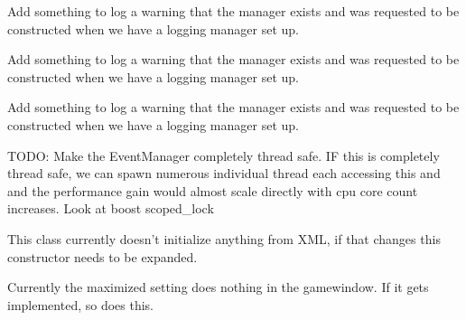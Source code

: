 \begin{DoxyRefList}
\item[\label{todo__todo000074}%
\hypertarget{todo__todo000074}{}%
Member \hyperlink{classMezzanine_1_1DefaultTimerManagerFactory_ad8cac8b702a8f9637ad1cd5e2ecddc3f}{Mezzanine\-:\-:Default\-Timer\-Manager\-Factory\-:\-:Create\-Manager} (X\-M\-L\-::\-Node \&X\-M\-L\-Node)]Add something to log a warning that the manager exists and was requested to be constructed when we have a logging manager set up.  
\item[\label{todo__todo000077}%
\hypertarget{todo__todo000077}{}%
Member \hyperlink{classMezzanine_1_1DefaultUIManagerFactory_aee5a9ea55ba77f7d118dc052605bf2d3}{Mezzanine\-:\-:Default\-U\-I\-Manager\-Factory\-:\-:Create\-Manager} (Name\-Value\-Pair\-List \&Params)]Add something to log a warning that the manager exists and was requested to be constructed when we have a logging manager set up.  
\item[\label{todo__todo000078}%
\hypertarget{todo__todo000078}{}%
Member \hyperlink{classMezzanine_1_1DefaultUIManagerFactory_a64230cbd8c6dffa83018189d0dae5116}{Mezzanine\-:\-:Default\-U\-I\-Manager\-Factory\-:\-:Create\-Manager} (X\-M\-L\-::\-Node \&X\-M\-L\-Node)]Add something to log a warning that the manager exists and was requested to be constructed when we have a logging manager set up.  
\item[\label{todo__todo000027}%
\hypertarget{todo__todo000027}{}%
Member \hyperlink{classMezzanine_1_1EventManager_a95ce9d2d865b0d8d9468448969b0ade2}{Mezzanine\-:\-:Event\-Manager\-:\-:Event\-Manager} ()]T\-O\-D\-O\-: Make the Event\-Manager completely thread safe. I\-F this is completely thread safe, we can spawn numerous individual thread each accessing this and and the performance gain would almost scale directly with cpu core count increases. Look at boost scoped\-\_\-lock  
\item[\label{todo__todo000028}%
\hypertarget{todo__todo000028}{}%
Member \hyperlink{classMezzanine_1_1EventManager_abf3650bfe862473ed2418dddbd83eec3}{Mezzanine\-:\-:Event\-Manager\-:\-:Event\-Manager} (X\-M\-L\-::\-Node \&X\-M\-L\-Node)]This class currently doesn't initialize anything from X\-M\-L, if that changes this constructor needs to be expanded.  
\item[\label{todo__todo000033}%
\hypertarget{todo__todo000033}{}%
Member \hyperlink{classMezzanine_1_1GraphicsManager_a0c643b05edba99f2c70d0fd9dacf3110}{Mezzanine\-:\-:Graphics\-Manager\-:\-:Append\-Current\-Settings} (X\-M\-L\-::\-Node \&Settings\-Root\-Node)]Currently the maximized setting does nothing in the gamewindow. If it gets implemented, so does this.  

\end{DoxyRefList}
